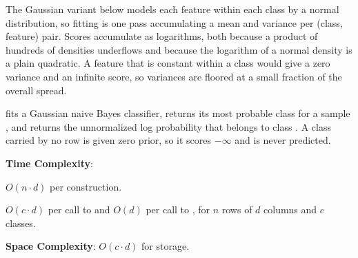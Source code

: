The Gaussian variant below models each feature within each class by a normal distribution, so fitting is one pass accumulating a mean and variance per (class, feature) pair. Scores accumulate as logarithms, both because a product of hundreds of densities underflows and because the logarithm of a normal density is a plain quadratic. A feature that is constant within a class would give a zero variance and an infinite score, so variances are floored at a small fraction of the overall spread.

\begin{compactitem}
  \item {} fits a Gaussian naive Bayes classifier,  returns its most probable class for a sample , and  returns the unnormalized log probability that  belongs to class . A class carried by no row is given zero prior, so it scores $-\infty$ and is never predicted.
\end{compactitem}

\textbf{Time Complexity}:
\begin{compactitem}
  \item $O(n \cdot d)$ per construction.
  \item $O(c \cdot d)$ per call to  and $O(d)$ per call to , for $n$ rows of $d$ columns and $c$ classes.
\end{compactitem}

\textbf{Space Complexity}: $O(c \cdot d)$ for storage.

